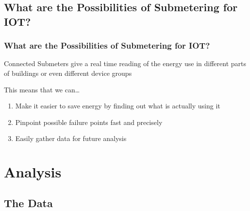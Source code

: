 \documentclass[10pt]{beamer}
\begin{document}
\subsection{What are the Possibilities of Submetering for IOT?}

\begin{frame}
\frametitle{What are the Possibilities of Submetering for IOT?}

Connected Submeters give a real time reading of the energy use in different parts of buildings
or even different device groups

\pause
\bigskip
This means that we can\ldots
\begin{enumerate}
    \item Make it easier to save energy by finding out what is actually using it
    \pause
    \item Pinpoint possible failure points fast and precisely
    \pause
    \item Easily gather data for future analysis
\end{enumerate}

\end{frame}


\section{Analysis}

\subsection{The Data}
\end{document}
